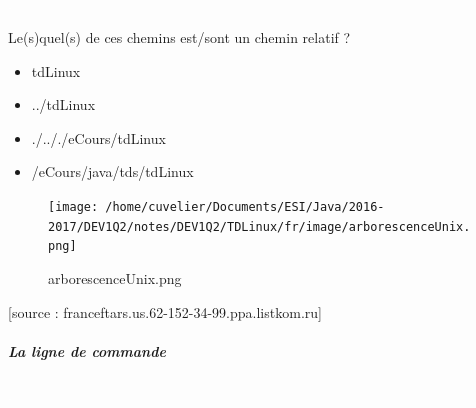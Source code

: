 \documentclass[11pt,a4paper]{article}
\begin{document}
			
		\subparagraph{} 
		
                \textcolor{white}{.} \par
            Le(s)quel(s) de ces chemins est/sont un chemin relatif ?
						
            \begin{itemize} 
        
            \item[ \ding{"6F} ] tdLinux
        
            \item[ \ding{"6F} ] ../tdLinux
        
            \item[ \ding{"6F} ] ./.././eCours/tdLinux
        
            \item[ \ding{"6F} ] /eCours/java/tds/tdLinux
        
            \end{itemize} 
        \begin{figure}[hbt]
				    \begin{center}
					\texttt{[image: /home/cuvelier/Documents/ESI/Java/2016-2017/DEV1Q2/notes/DEV1Q2/TDLinux/fr/image/arborescenceUnix.png]}
						\end{center}
                
                    \caption[arborescenceUnix.png]{arborescenceUnix.png}
                \end{figure}
                    
			    
			    [source : franceftars.us.62-152-34-99.ppa.listkom.ru]
        
            \par
        
			
		\subparagraph{La ligne de commande} 
		
                \textcolor{white}{.} \par
            
\end{document}
